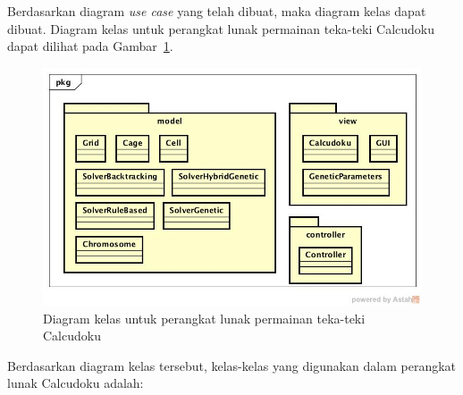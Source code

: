 Berdasarkan diagram \textit{use case} yang telah dibuat, maka diagram kelas dapat dibuat. Diagram kelas untuk perangkat lunak permainan teka-teki Calcudoku dapat dilihat pada Gambar~\ref{fig:analisiskelas}.

\begin{figure}
\centering
\captionsetup{justification=centering}
\includegraphics[scale=0.5]{Gambar/Analisis/DiagramKelas.jpg}
\caption[Diagram kelas untuk perangkat lunak permainan teka-teki Calcudoku]{Diagram kelas untuk perangkat lunak permainan teka-teki Calcudoku}
\label{fig:analisiskelas}
\end{figure}

Berdasarkan diagram kelas tersebut, kelas-kelas yang digunakan dalam perangkat lunak Calcudoku adalah:

